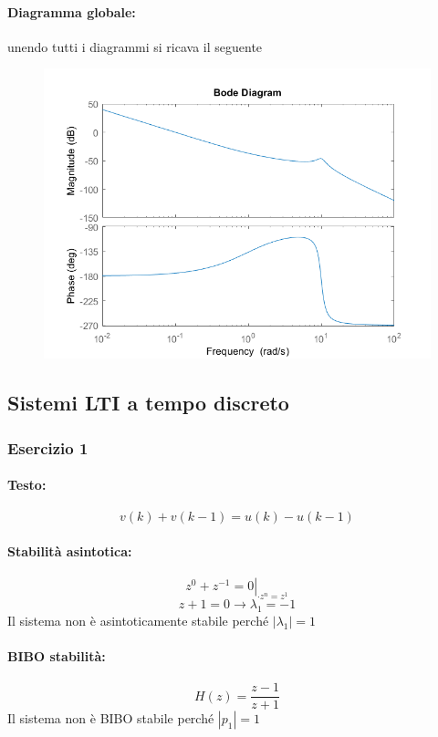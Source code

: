\documentclass[a4paper]{article}
\begin{document}
	\paragraph{Diagramma globale:}
	unendo tutti i diagrammi si ricava il seguente
	\begin{figure}[h]
		\centering
		\includegraphics[scale=0.5]{globale}
		\label{fig:globale}
	\end{figure}
	\newpage
	
	
	\subsection{Sistemi LTI a tempo discreto}
	
	\subsubsection{Esercizio 1}
	\paragraph{Testo:}
	\[ v(k) + v(k-1) = u(k) - u(k-1) \]
	
	\paragraph{Stabilità asintotica:}
	\[ \left. z^0 + z^{-1} = 0 \right|_{\cdot z^n = z^1} \]
	\[ z + 1 = 0 \longrightarrow \lambda_1 = -1 \]
	Il sistema non è asintoticamente stabile perché $|\lambda_1|=1$
	
	\paragraph{BIBO stabilità:}
	\[ H(z) = \frac{z-1}{z+1} \]
	Il sistema non è BIBO stabile perché $|p_1|=1$
	
\end{document}

